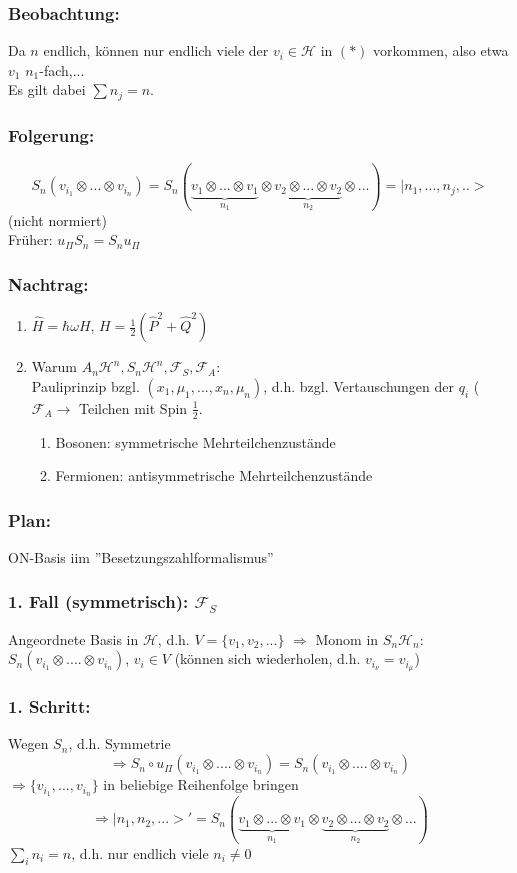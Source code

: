 \documentclass[twoside,a4paper]{scrartcl}
\renewcommand{\1}{\mathds{1}}
\newcommand{\Ra}{\Rightarrow}
\newcommand{\ra}{\rightarrow}
\renewcommand{\H}{\mathcal{H}}
\newcommand{\F}{\mathcal{F}}
\begin{document}
\subsubsection*{Beobachtung:} 
Da $n$ endlich, können nur endlich viele der $v_i \in \H$ in $(*)$ vorkommen, also etwa $v_1$ $n_1$-fach,...\\
Es gilt dabei $\sum n_j=n$.
\subsubsection*{Folgerung:} 
$$S_n(v_{i_1}\otimes ... \otimes v_{i_n})=S_n (\underbrace {v_{1}\otimes ...\otimes v_{1}}_{n_1}\otimes \underbrace {v_{2}\otimes ...\otimes v_{2}}_{n_2}\otimes ...)=|n_1,...,n_j,..>$$
(nicht normiert)\\
Früher: $u_\Pi S_n= S_n u_\Pi$
\subsubsection*{Nachtrag:} 
\begin{enumerate}
\item $\hat H= \hbar \omega H$, $H=\frac{1}{2}(\hat P^2+\hat Q^2)$
\item Warum $A_n\H^n, S_n\H^n, \F_S, \F_A$:\\
Pauliprinzip bzgl. $(x_1,\mu_1,...,x_n,\mu_n)$, d.h. bzgl. Vertauschungen der $q_i$ ($\F_A \ra$ Teilchen mit Spin $\frac{1}{2}$.
\begin{enumerate}
\item Bosonen: symmetrische Mehrteilchenzustände
\item Fermionen: antisymmetrische Mehrteilchenzustände
\end{enumerate}
\end{enumerate}
\subsubsection*{Plan:} 
ON-Basis iim ''Besetzungszahlformalismus''
\subsubsection*{1. Fall (symmetrisch): $\F_S$} 
 Angeordnete Basis in $\H$,  d.h. $V=\{v_1,v_2,...\}$ $\Ra$ Monom in $S_n\H_n$: $S_n(v_{i_1}\otimes .... \otimes v_{i_n})$, $v_i\in V$ (können sich wiederholen, d.h. $v_{i_\nu}=v_{i_\mu}$)
\subsubsection*{1. Schritt:} 
 Wegen $S_n$, d.h. Symmetrie 
$$\Ra S_n \circ u_\Pi(v_{i_1}\otimes .... \otimes v_{i_n})=S_n(v_{i_1}\otimes .... \otimes v_{i_n})$$
$\Ra \{v_{i_1},...,v_{i_n}\}$ in beliebige Reihenfolge bringen
$$\Ra |n_1,n_2,...>'=S_n(\underbrace {v_1\otimes ... \otimes v_1}_{n_1} \otimes \underbrace {v_2 \otimes ... \otimes v_2}_{n_2} \otimes ...)$$
$\sum_i n_i=n$, d.h. nur endlich viele $n_i \neq 0$
\end{document}
